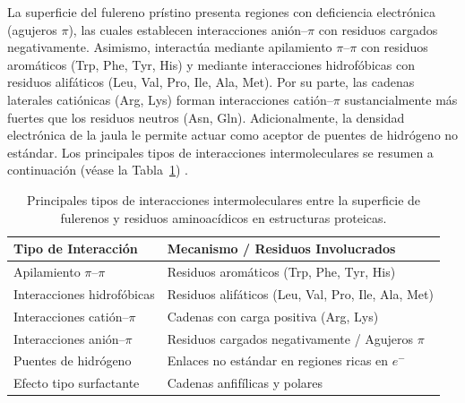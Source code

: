 La superficie del fulereno prístino presenta regiones con deficiencia electrónica (agujeros $\pi$), las cuales establecen interacciones anión--$\pi$ con residuos cargados negativamente. Asimismo, interactúa mediante apilamiento $\pi$--$\pi$ con residuos aromáticos (Trp, Phe, Tyr, His) y mediante interacciones hidrofóbicas con residuos alifáticos (Leu, Val, Pro, Ile, Ala, Met). Por su parte, las cadenas laterales catiónicas (Arg, Lys) forman interacciones catión--$\pi$ sustancialmente más fuertes que los residuos neutros (Asn, Gln). Adicionalmente, la densidad electrónica de la jaula le permite actuar como aceptor de puentes de hidrógeno no estándar. %
 Los principales tipos de interacciones intermoleculares se resumen a continuación (véase la Tabla~\ref{tab:interacciones_fulereno}) \cite{bolshakova2023facile}.

\begin{table}[H]
\centering
\caption{Principales tipos de interacciones intermoleculares entre la superficie de fulerenos y residuos aminoacídicos en estructuras proteicas.}
\label{tab:interacciones_fulereno}
\begin{tabular}{l l}
\toprule
\textbf{Tipo de Interacción} & \textbf{Mecanismo / Residuos Involucrados} \\
\midrule
Apilamiento $\pi$--$\pi$ & Residuos aromáticos (Trp, Phe, Tyr, His) \\
Interacciones hidrofóbicas & Residuos alifáticos (Leu, Val, Pro, Ile, Ala, Met) \\
Interacciones catión--$\pi$ & Cadenas con carga positiva (Arg, Lys) \\
Interacciones anión--$\pi$ & Residuos cargados negativamente / Agujeros $\pi$ \\
Puentes de hidrógeno & Enlaces no estándar en regiones ricas en $e^-$ \\
Efecto tipo surfactante & Cadenas anfifílicas y polares \\
\bottomrule
\end{tabular}
\end{table}

